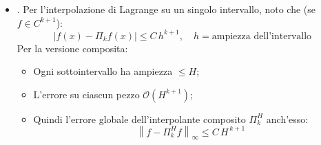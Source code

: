 \begin{enumerate}
\begin{remarkbox}
\begin{itemize}
            \item {}. Per l'interpolazione di Lagrange su un singolo intervallo, \eaccent noto che (se $f \in C^{k+1}$):
            \begin{equation*}
                \left|f(x) - \Pi_{k}f(x)\right| \le C \, h^{k+1}, \quad h = \text{ampiezza dell'intervallo}
            \end{equation*}
            Per la versione composita:
            \begin{itemize}
                \item Ogni sottointervallo ha ampiezza $\le H$;
                \item L'errore su ciascun pezzo \eaccent $\mathcal{O}\left(H^{k+1}\right)$;
                \item Quindi l'errore globale dell'interpolante composito $\Pi_{k}^{H}$ \eaccent anch'esso:
                \begin{equation*}
                    \left\| f - \Pi_{k}^{H} f \right\|_{\infty} \le C \, H^{\,k+1}
                \end{equation*}
            \end{itemize}
        \end{itemize}
    \end{remarkbox}
\end{enumerate}